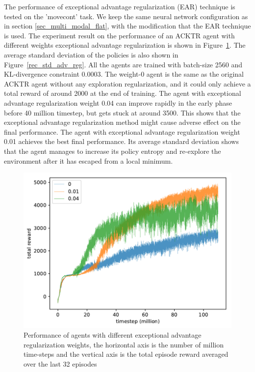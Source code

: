 The performance of exceptional advantage regularization (EAR) technique is tested on the 'movecont' task. We keep the same neural network configuration as in section \ref{sec_multi_modal_flat}, with the modification that the EAR technique is used.
The experiment result on the performance of an ACKTR agent with different weights exceptional advantage regularization is shown in Figure~\ref{rec_adv_reg}. The average standard deviation of the policies is also shown in Figure~\ref{rec_std_adv_reg}. All the agents are trained with batch-size 2560 and KL-divergence constraint 0.0003. The weight-0 agent is the same as the original ACKTR agent without any exploration regularization, and it could only achieve a total reward of around 2000 at the end of training. The agent with exceptional advantage regularization weight 0.04 can improve rapidly in the early phase before 40 million timestep, but gets stuck at around 3500. This shows that the exceptional advantage regularization method might cause adverse effect on the final performance. The agent with exceptional advantage regularization weight 0.01 achieves the best final performance. Its average standard deviation shows that the agent manages to increase its policy entropy and re-explore the environment after it has escaped from a local minimum.
\begin{figure}[!htbp]
	\includegraphics[width=\textwidth]{images/rec_180606_adv_reg.pdf}
	\centering
	\caption{Performance of agents with different exceptional advantage regularization weights, the horizontal axis is the number of million time-steps and the vertical axis is the total episode reward averaged over the last 32 episodes}\label{rec_adv_reg}
\end{figure}

